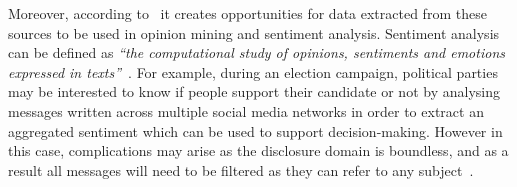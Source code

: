 Moreover, according to~\textcite{rep:LERC} it creates opportunities for data extracted from these sources to be used in opinion mining and sentiment analysis. Sentiment analysis can be defined as \emph{``the computational study of opinions, sentiments and emotions expressed in texts''}~\parencite{inbook:lang_proc_sec}. For example, during an election campaign, political parties may be interested to know if people support their candidate or not by analysing messages written across multiple social media networks in order to extract an aggregated sentiment which can be used to support decision-making. However in this case, complications may arise as the disclosure domain is boundless, and as a result all messages will need to be filtered as they can refer to any subject~\parencite{art:computers_human_behaviour}.
